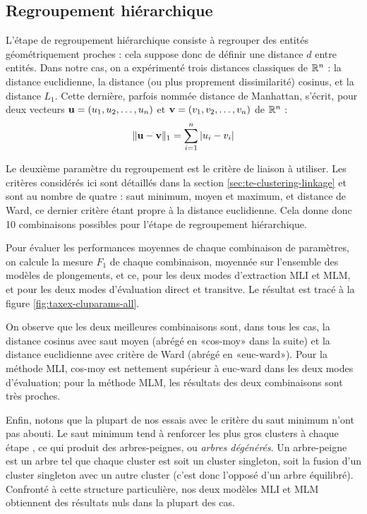 \subsection{Regroupement hiérarchique}

L'étape de regroupement hiérarchique consiste à regrouper des entités géométriquement proches : cela suppose donc de définir une distance $d$ entre entités. Dans notre cas, on a expérimenté trois distances classiques de $\R^n$ : la distance euclidienne,  la distance (ou plus proprement dissimilarité) cosinus, et la distance $L_1$. Cette dernière, parfois nommée distance de Manhattan, s'écrit, pour deux vecteurs $\bf{u} = (u_1, u_2, \ldots, u_n)$ et $\bf{v} = (v_1, v_2, \ldots, v_n)$ de $\R^n$ :
\begin{equation}
    \| \bf{u - v} \|_1 = \sum_{i=1}^{n} | u_i - v_i |
\end{equation}

Le deuxième paramètre du regroupement est le critère de liaison à utiliser. Les critères considérés ici sont détaillés dans la section \ref{sec:te-clustering-linkage} et sont au nombre de quatre : saut minimum, moyen et maximum, et distance de Ward, ce dernier critère étant propre à la distance euclidienne. Cela donne donc 10 combinaisons possibles pour l'étape de regroupement hiérarchique.

Pour évaluer les performances moyennes de chaque combinaison de paramètres, on calcule la mesure $F_1$ de chaque combinaison, moyennée sur l'ensemble des modèles de plongements, et ce, pour les deux modes d'extraction MLI et MLM, et pour les deux modes d'évaluation direct et transitve. Le résultat est tracé à la figure \ref{fig:taxex-cluparams-all}.

On observe que les deux meilleures combinaisons sont, dans tous les cas, la distance cosinus avec saut moyen (abrégé en «cos-moy» dans la suite) et la distance euclidienne avec critère de Ward (abrégé en «euc-ward»). Pour la méthode MLI, cos-moy est nettement supérieur à euc-ward dans les deux modes d'évaluation; pour la méthode MLM, les résultats des deux combinaisons sont très proches. 

Enfin, notons que la plupart de nos essais avec le critère du saut minimum n'ont pas abouti. Le saut minimum tend à renforcer les plus gros clusters à chaque étape \cite{everitt2011cluster}, ce qui produit des arbres-peignes, ou \textit{arbres dégénérés}. Un arbre-peigne est un arbre tel que chaque cluster est soit un cluster singleton, soit la fusion d'un cluster singleton avec un autre cluster (c'est donc l'opposé d'un arbre équilibré). Confronté à cette structure particulière, nos deux modèles MLI et MLM obtiennent des résultats nuls dans la plupart des cas.

